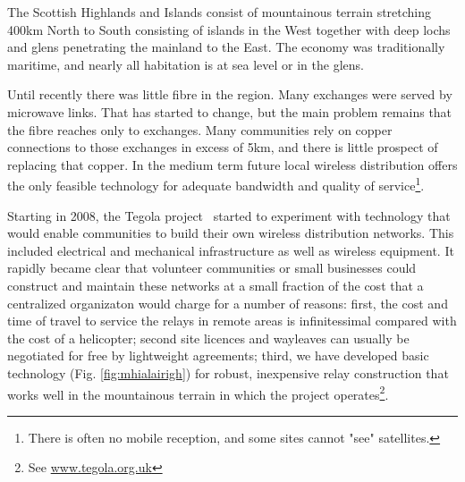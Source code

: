
The Scottish Highlands and Islands consist of mountainous  terrain stretching 400km North to South consisting of islands in the West together with deep lochs and glens penetrating the mainland to the East.  The economy was traditionally maritime, and nearly all habitation is at sea level or in the glens.  

Until recently there was little fibre in the region.  Many exchanges were served by microwave links. That has started to change, but the main problem remains that the fibre reaches only to exchanges.  Many communities rely on copper connections to those exchanges in excess of 5km, and there is little prospect of replacing that copper.  In the medium term future local wireless distribution offers the only feasible technology for adequate bandwidth and quality of service\footnote{There is often no mobile reception, and some sites cannot "see" satellites.}.

Starting in 2008, the Tegola project~\cite{tegola} started to experiment with technology that would enable communities to build their own wireless distribution networks.  This included electrical and mechanical infrastructure as well as wireless equipment.  It rapidly became clear that volunteer communities or small businesses could construct and maintain these networks at a small fraction of the cost that a centralized organizaton would charge for a number of reasons: first, the cost and time of travel to service the relays in remote areas is infinitessimal compared with the cost of a helicopter; second site licences and wayleaves can usually be negotiated for free by lightweight agreements; third, we have developed basic technology (Fig. \ref{fig:mhialairigh}) for robust, inexpensive relay construction that works well in the mountainous terrain in which the project operates\footnote{See \url{www.tegola.org.uk}}.

